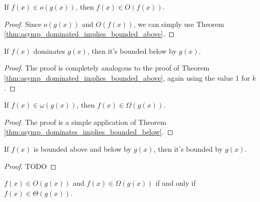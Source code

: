 \begin{theorem}
    \label{thm:small_o_implies_big_o}
    \leanok
    If $f(x) \in o(g(x))$, then $f(x) \in O(f(x))$.
\end{theorem}

\begin{proof}
    \leanok
    Since $o(g(x))$ and $O(f(x))$, we can simply use Theorem 
    \ref{thm:asymp_dominated_implies_bounded_above}.
\end{proof}

\begin{theorem}
    \label{thm:asymp_dominates_implies_bounded_below}
    \leanok
    If $f(x)$ dominates $g(x)$, then it's bounded below by $g(x)$.
\end{theorem}

\begin{proof}
    \leanok
    The proof is completely analogous to the proof of Theorem 
    \ref{thm:asymp_dominated_implies_bounded_above}, again using the value $1$ for $k$.
\end{proof}

\begin{theorem}
    \label{thm:small_omega_implies_big_omega}
    \leanok
    If $f(x) \in \omega(g(x))$, then $f(x) \in \Omega(g(x))$.
\end{theorem}

\begin{proof}
    \leanok
    The proof is a simple application of Theorem 
    \ref{thm:asymp_dominates_implies_bounded_below}.
\end{proof}

\begin{theorem}
    \label{thm:asymp_bounded_above_and_below_equiv_bounded}
    \leanok
    If $f(x)$ is bounded above and below by $g(x)$, then it's bounded by $g(x)$.
\end{theorem}

\begin{proof}
    \leanok
    TODO
\end{proof}

\begin{theorem}
    \label{thm:big_o_and_omega_equiv_theta}
    \leanok
    $f(x) \in O(g(x))$ and $f(x) \in \Omega(g(x))$ if and only if $f(x) \in \Theta(g(x))$.
\end{theorem}

